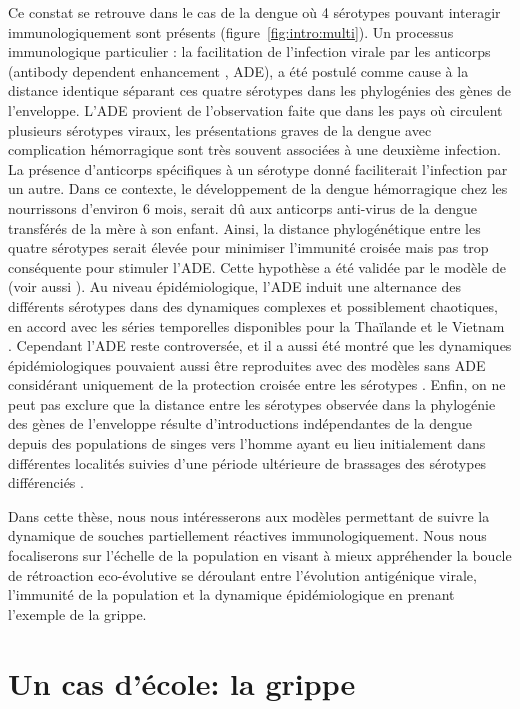 Ce constat se retrouve dans le cas de la dengue où 4 sérotypes pouvant
interagir immunologiquement sont présents
(figure~\ref{fig:intro:multi}). Un processus immunologique particulier
: la facilitation de l'infection virale par les anticorps (antibody
dependent enhancement , ADE), a été postulé comme cause à la distance
identique séparant ces quatre sérotypes dans les phylogénies des gènes
de l'enveloppe. L'ADE provient de l'observation faite que dans les
pays où circulent plusieurs sérotypes viraux, les présentations graves
de la dengue avec complication hémorragique sont très souvent
associées à une deuxième infection. La présence d'anticorps
spécifiques à un sérotype donné faciliterait l'infection par un autre.
Dans ce contexte, le développement de la dengue hémorragique chez les
nourrissons d'environ 6 mois, serait dû aux anticorps anti-virus de la
dengue transférés de la mère à son enfant. Ainsi, la distance
phylogénétique entre les quatre sérotypes serait élevée pour minimiser
l'immunité croisée mais pas trop conséquente pour stimuler l'ADE.
Cette hypothèse a été validée par le modèle de \citet{Kawaguchi2003}
(voir aussi \citet{Adams2006}). Au niveau épidémiologique, l'ADE
induit une alternance des différents sérotypes dans des dynamiques
complexes et possiblement chaotiques, en accord avec les séries
temporelles disponibles pour la Thaïlande et le Vietnam
\citep{Ferguson1999, Cummings2005, Recker2009}. Cependant l'ADE reste
controversée, et il a aussi été montré que les dynamiques
épidémiologiques pouvaient aussi être reproduites avec des modèles
sans ADE considérant uniquement de la protection croisée entre les
sérotypes \citep{Wearing2006, Adams2006a, Aguiar2007}. Enfin, on ne
peut pas exclure que la distance entre les sérotypes observée dans la
phylogénie des gènes de l'enveloppe résulte d'introductions
indépendantes de la dengue depuis des populations de singes vers
l'homme ayant eu lieu initialement dans différentes localités suivies
d'une période ultérieure de brassages des sérotypes différenciés
\citep{Holmes2003a}.


Dans cette thèse, nous nous intéresserons aux modèles permettant de
suivre la dynamique de souches partiellement réactives
immunologiquement. Nous nous focaliserons sur l'échelle de la
population en visant à mieux appréhender la boucle de rétroaction
eco-évolutive se déroulant entre l'évolution antigénique virale,
l'immunité de la population et la dynamique épidémiologique en prenant
l'exemple de la grippe.

\section{Un cas d'école: la grippe}

